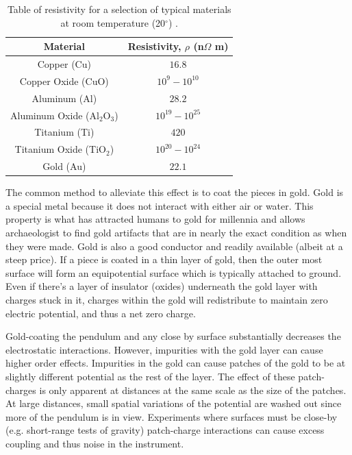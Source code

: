 \documentclass{book}
\begin{document}
\begin{center}		
	\begingroup
	\setlength{\tabcolsep}{10pt} %
	\renewcommand{\arraystretch}{1.5} %
	\begin{table}[ht!]
		\begin{center}
			\begin{tabular}{ |c|c| }
				\hline
				Material & Resistivity, $\rho$ (n$\Omega$ m) \\
				\hline
				Copper (Cu) & $16.8$ \\
				Copper Oxide (CuO) & $10^9-10^{10}$ \\
				Aluminum (Al) & $28.2$\\
				Aluminum Oxide (Al$_2$O$_3$) & $10^{19}-10^{25}$\\
				Titanium (Ti) & $420$\\
				Titanium Oxide (TiO$_2$) & $10^{20}-10^{24}$\\				
				Gold (Au) & $22.1$\\
				\hline
				
			\end{tabular}
			\caption{Table of resistivity for a selection of typical materials at room temperature (20$^\circ$) \cite{Matula, serway, resist, tiox, slade}.}\label{ResistTable}
		\end{center}
	\end{table}
	\endgroup
\end{center}

The common method to alleviate this effect is to coat the pieces in gold. Gold is a special metal because it does not interact with either air or water. This property is what has attracted humans to gold for millennia and allows archaeologist to find gold artifacts that are in nearly the exact condition as when they were made. Gold is also a good conductor and readily available (albeit at a steep price). If a piece is coated in a thin layer of gold, then the outer most surface will form an equipotential surface which is typically attached to ground. Even if there's a layer of insulator (oxides) underneath the gold layer with charges stuck in it, charges within the gold will redistribute to maintain zero electric potential, and thus a net zero charge. 

Gold-coating the pendulum and any close by surface substantially decreases the electrostatic interactions. However, impurities with the gold layer can cause higher order effects. Impurities in the gold can cause patches of the gold to be at slightly different potential as the rest of the layer. The effect of these patch-charges is only apparent at distances at the same scale as the size of the patches. At large distances, small spatial variations of the potential are washed out since more of the pendulum is in view. Experiments where surfaces must be close-by (e.g. short-range tests of gravity) patch-charge interactions can cause excess coupling and thus noise in the instrument.
\end{document}
